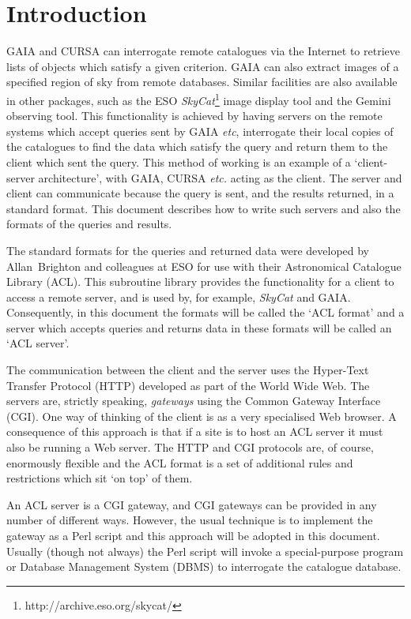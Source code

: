 \documentclass[twoside,11pt]{article}
\newcommand{\htmladdnormallinkfoot}[2]{#1\footnote{#2}}
\newcommand{\xref}[3]{#1}
\newcommand{\xlabel}[1]{}
\renewcommand{\_}{\texttt{\symbol{95}}}
\begin{document}
\section{\xlabel{INTRO}\label{INTRO}Introduction}

\xref{GAIA}{sun214}{}\cite{SUN214} and \xref{CURSA}{sun190}{}\cite{SUN190}
can interrogate remote catalogues via the Internet to retrieve lists of
objects which satisfy a given criterion.  GAIA can also extract images
of a specified region of sky from remote databases.  Similar facilities
are also available in other packages, such as the ESO 
\htmladdnormallinkfoot{{\it SkyCat}\/}{http://archive.eso.org/skycat/}
image display tool and the Gemini observing tool.  This functionality
is achieved by having servers on the remote systems which accept queries
sent by GAIA \emph{etc}, interrogate their local copies of the catalogues
to find the data which satisfy the query and return them to the client
which sent the query.  This method of working is an example of a
`client-server architecture', with GAIA, CURSA \emph{etc.} acting as the
client.  The server and client can communicate because the query is sent,
and the results returned, in a standard format.  This document describes
how to write such servers and also the formats of the queries and results.

The standard formats for the queries and returned data were developed by
Allan~Brighton and colleagues at ESO for use with their Astronomical
Catalogue Library (ACL).  This subroutine library provides the
functionality for a client to access a remote server, and is used by,
for example, {\it SkyCat}\/ and GAIA.  Consequently, in this document
the formats will be called the `ACL format' and a server which accepts
queries and returns data in these formats will be called an `ACL server'.

The communication between the client and the server uses the Hyper-Text
Transfer Protocol (HTTP)  developed as part of the World Wide Web.  The
servers are, strictly speaking, {\it gateways}\/ using the Common Gateway
Interface (CGI).  One way of thinking of the client is as a very
specialised Web browser.  A consequence of this approach is that if a
site is to host an ACL server it must also be running a Web server.  The
HTTP and CGI protocols are, of course, enormously flexible and the
ACL format is a set of additional rules and restrictions which sit `on
top' of them.

An ACL server is a CGI gateway, and CGI gateways can be provided in any
number of different ways.  However, the usual technique is to implement
the gateway as a Perl script and this approach will be adopted in this
document.  Usually (though not always) the Perl script will invoke a
special-purpose program or Database Management System (DBMS) to
interrogate the catalogue database.
\end{document}
